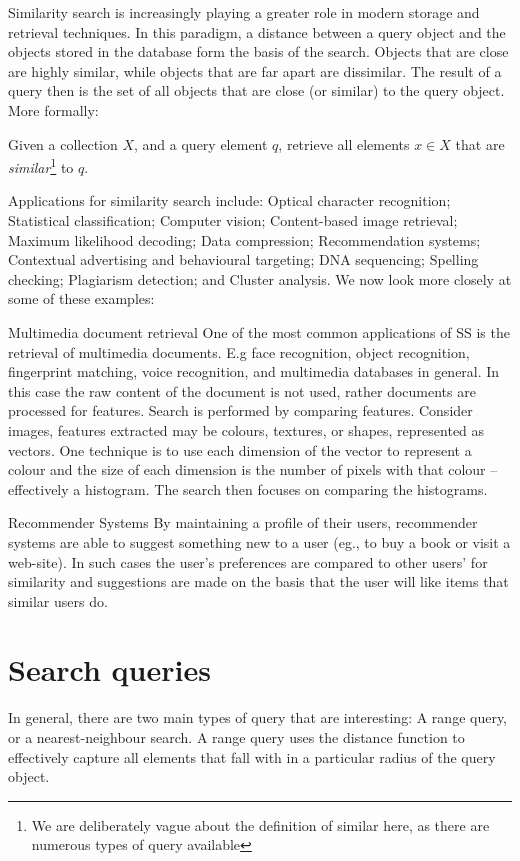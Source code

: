 Similarity search is increasingly playing a greater role in modern storage and retrieval techniques. In this paradigm, a distance between a query object and the objects stored in the database form the basis of the search. Objects that are close are highly similar, while objects that are far apart are dissimilar.  The result of a query then is the set of all objects that are close (or similar) to the query object.
More formally:
%
\begin{mydef} 
Given a collection $X$, and a query element $q$, retrieve all elements $x \in X$ that are \textit{similar}\footnote{We are deliberately vague about the definition of similar here, as there are numerous types of query available} to $q$. 
\end{mydef}
%
\noindent Applications for similarity search include: Optical character recognition;
 Statistical classification;
 Computer vision;
 Content-based image retrieval;
 Maximum likelihood decoding; 
 Data compression;
 Recommendation systems;
 Contextual advertising and behavioural targeting;
 DNA sequencing;
 Spelling checking; 
 Plagiarism detection; and 
 Cluster analysis.     
We now look more closely at some of these examples:
%
\begin{myexample}{Multimedia document retrieval}
One of the most common applications of SS is the retrieval of multimedia documents. E.g face recognition, object recognition, fingerprint matching, voice recognition, and multimedia databases in general. In this case the raw content of the document is not used, rather documents are processed for features.  Search is performed by comparing features.  Consider images, features extracted may be colours, textures, or shapes, represented as vectors.  One technique is to use each dimension of the vector to represent a colour and the size of each dimension is the number of pixels with that colour -- effectively a histogram.  The search then focuses on comparing the histograms.
\end{myexample}
%
\noindent 
%
\begin{myexample}{Recommender Systems}
By maintaining a profile of their users, recommender systems are able to suggest something new to a user (eg., to buy a book or visit a web-site).  In such cases the user's preferences are compared to other users' for similarity and suggestions are made on the basis that the user will like items that similar users do.
\end{myexample}
% 
\section{Search queries}
In general, there are two main types of query that are interesting: A range query, or a nearest-neighbour search.  A range query uses the distance function to effectively capture all elements that fall with in a particular radius of the query object.
  
